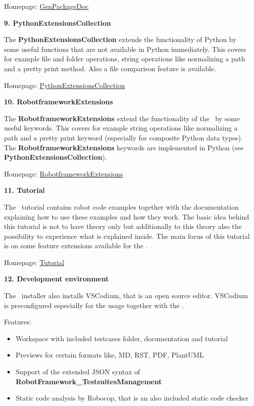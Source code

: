 Homepage: \href{https://github.com/test-fullautomation/python-genpackagedoc}{GenPackageDoc}

\vspace{2ex}

\textbf{9. PythonExtensionsCollection}

The \textbf{PythonExtensionsCollection} extends the functionality of Python by some useful functions that are not available in Python immediately.
This covers for example file and folder operations, string operations like normalizing a path and a pretty print method.
Also a file comparison feature is available.

Homepage: \href{https://github.com/test-fullautomation/python-extensions-collection}{PythonExtensionsCollection}

\vspace{2ex}

\textbf{10. RobotframeworkExtensions}

The \textbf{RobotframeworkExtensions} extend the functionality of the \rfwcore\ by some useful keywords.
This covers for example string operations like normalizing a path and a pretty print keyword (especially for composite
Python data types). The \textbf{RobotframeworkExtensions} keywords are implemented in Python (see \textbf{PythonExtensionsCollection}).

Homepage: \href{https://github.com/test-fullautomation/robotframework-extensions-collection}{RobotframeworkExtensions}

\vspace{2ex}

\textbf{11. Tutorial}

The \rfw\ tutorial contains robot code examples together with the documentation explaining how to use these examples and how they work.
The basic idea behind this tutorial is not to have theory only but additionally to this theory also the possibility to experience what is explained inside.
The main focus of this tutorial is on some feature extensions available for the \rfwcore.

Homepage: \href{https://github.com/test-fullautomation/robotframework-tutorial}{Tutorial}

\newpage

\textbf{12. Development environment}

The \rfw\ installer also installs VSCodium, that is an open source editor. VSCodium is preconfigured especially for the usage together with
the \rfw.

Features:

\begin{itemize}
   \item Workspace with included testcases folder, documentation and tutorial
   \item Previews for certain formats like, MD, RST, PDF, PlantUML
   \item Support of the extended JSON syntax of \textbf{RobotFramework\_TestsuitesManagement}
   \item Static code analysis by Robocop, that is an also included static code checker
\end{itemize}




